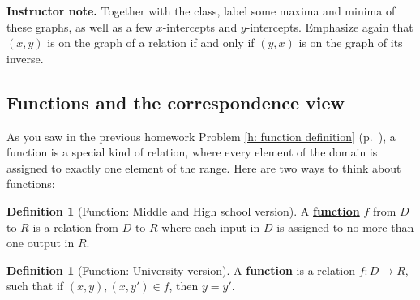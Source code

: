 \documentclass[11pt]{article}
\newcommand\smallnote[1]
	{\begin{mdframed}\raggedright  {\bf Instructor note.} {#1} \end{mdframed}}
\renewcommand\emph[1]{\underline{\bf{#1}}} %
\theoremstyle{definition}
\newtheorem{definition}[theorem]{Definition}
\begin{document}
\smallnote{Together with the class, label some maxima and minima of these graphs, as well as a few $x$-intercepts and $y$-intercepts. Emphasize again that $(x,y)$ is on the graph of a relation if and only if $(y,x)$ is on the graph of its inverse.}

\newpage

\subsection{Functions and the correspondence view}


As you saw in the previous homework Problem \ref{h: function definition} (p.~\pageref{h: function definition}), a function is a special kind of relation, where every element of the domain is assigned to exactly one element of the range. Here are two ways to think about functions: 

\begin{definition}[Function: Middle and High school version]\label{d: function middle high school}
A \emph{function} $f$ from $D$ to $R$ is a relation from $D$ to $R$ where each input in $D$ is assigned to no more than one output in $R$.
\end{definition} 
 
\begin{definition}[Function: University version]\label{d: function university} 
A \emph{function} is a relation $f: D \to R$, such that if $(x,y), (x, y')\in f$, then $y=y'$.
\end{definition}
\end{document}
